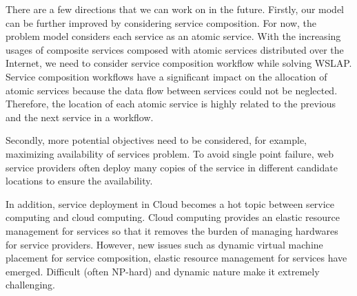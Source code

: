 \documentclass[10pt,journal,compsoc]{IEEEtran}
\begin{document}

There are a few directions that we can work on in the future. Firstly, our model can be further improved by considering service composition. For now, the problem model considers each service as an atomic service. With the increasing usages of composite services composed with atomic services distributed over the Internet, we need to consider service composition workflow while solving WSLAP.   Service composition workflows have a significant impact on the allocation of atomic services because the data flow between services could not be neglected. Therefore, the location of each atomic service is highly related to the previous and the next service in a workflow.

Secondly, more potential objectives need to be considered, for example, maximizing availability of services problem. To avoid single point failure, web service providers often deploy many copies of the service in different candidate locations to ensure the availability. 

In addition, service deployment in Cloud becomes a hot topic between service computing and cloud computing. Cloud computing provides an elastic resource management for services so that it removes the burden of managing hardwares for service providers. However, new issues such as dynamic virtual machine placement for service composition, elastic resource management for services have emerged. Difficult (often NP-hard) and dynamic nature make it extremely challenging.

\vspace{-5 mm}

\end{document}
